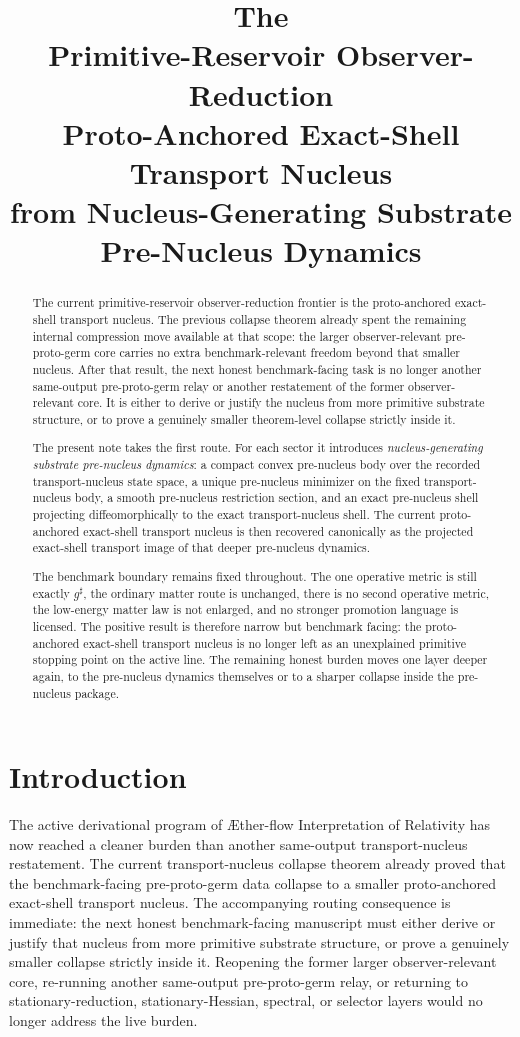 \documentclass[11pt]{article}
\title{\textbf{The \TheoryName{}}\\[0.4em]
\large Primitive-Reservoir Observer-Reduction\\
\large Proto-Anchored Exact-Shell Transport Nucleus\\
\large from Nucleus-Generating Substrate Pre-Nucleus Dynamics}
\author{}
\date{}
\newcommand{\Aflow}{\AE{}ther-flow}
\newcommand{\TheoryName}{\Aflow{} Interpretation of Relativity}
\newcommand{\CompletedMetric}{g^{\sharp}}
\begin{document}
\maketitle

\begin{abstract}
The current primitive-reservoir observer-reduction frontier is the proto-anchored exact-shell transport nucleus. The previous collapse theorem already spent the remaining internal compression move available at that scope: the larger observer-relevant pre-proto-germ core carries no extra benchmark-relevant freedom beyond that smaller nucleus. After that result, the next honest benchmark-facing task is no longer another same-output pre-proto-germ relay or another restatement of the former observer-relevant core. It is either to derive or justify the nucleus from more primitive substrate structure, or to prove a genuinely smaller theorem-level collapse strictly inside it.

The present note takes the first route. For each sector it introduces \emph{nucleus-generating substrate pre-nucleus dynamics}: a compact convex pre-nucleus body over the recorded transport-nucleus state space, a unique pre-nucleus minimizer on the fixed transport-nucleus body, a smooth pre-nucleus restriction section, and an exact pre-nucleus shell projecting diffeomorphically to the exact transport-nucleus shell. The current proto-anchored exact-shell transport nucleus is then recovered canonically as the projected exact-shell transport image of that deeper pre-nucleus dynamics.

The benchmark boundary remains fixed throughout. The one operative metric is still exactly \(\CompletedMetric\), the ordinary matter route is unchanged, there is no second operative metric, the low-energy matter law is not enlarged, and no stronger promotion language is licensed. The positive result is therefore narrow but benchmark facing: the proto-anchored exact-shell transport nucleus is no longer left as an unexplained primitive stopping point on the active line. The remaining honest burden moves one layer deeper again, to the pre-nucleus dynamics themselves or to a sharper collapse inside the pre-nucleus package.
\end{abstract}

\section{Introduction}

The active derivational program of \TheoryName{} has now reached a cleaner burden than another same-output transport-nucleus restatement. The current transport-nucleus collapse theorem already proved that the benchmark-facing pre-proto-germ data collapse to a smaller proto-anchored exact-shell transport nucleus. The accompanying routing consequence is immediate: the next honest benchmark-facing manuscript must either derive or justify that nucleus from more primitive substrate structure, or prove a genuinely smaller collapse strictly inside it. Reopening the former larger observer-relevant core, re-running another same-output pre-proto-germ relay, or returning to stationary-reduction, stationary-Hessian, spectral, or selector layers would no longer address the live burden.
\end{document}
